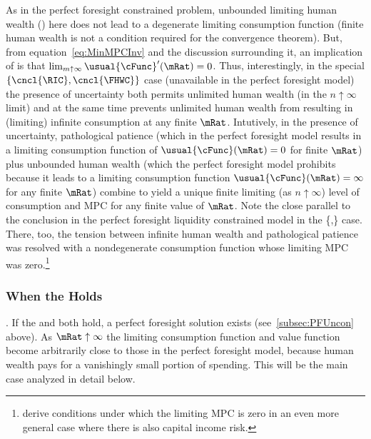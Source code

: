 \documentclass[BufferStockTheory]{subfiles}
\begin{document}
As in the perfect foresight constrained problem, unbounded limiting human wealth (\cncl{\FHWC}) here does not lead to a degenerate limiting consumption function (finite human wealth is not a condition required for the convergence theorem).  But, from equation~\eqref{eq:MinMPCInv} and the discussion surrounding it, an implication of \cncl{\RIC} is that $\lim_{m \uparrow \infty} \usual{\cFunc}^{\prime}(\mRat) = 0$.  Thus, interestingly, in the special $\{\cncl{\RIC},\cncl{\FHWC}\}$ case (unavailable in the perfect foresight model) the presence of uncertainty both permits unlimited human wealth (in the $n\uparrow\infty$ limit) and at the same time prevents unlimited human wealth from resulting in (limiting) infinite consumption at any finite $\mRat$.  Intutively, in the presence of uncertainty, pathological patience (which in the perfect foresight model results in a limiting consumption function of $\usual{\cFunc}(\mRat)=0$ for finite $\mRat$) plus unbounded human wealth (which the perfect foresight model prohibits because it leads to a limiting consumption function $\usual{\cFunc}(\mRat)=\infty$ for any finite $\mRat$) combine to yield a unique finite limiting (as $n \uparrow \infty$) level of consumption and MPC for any finite value of $\mRat$.  Note the close parallel to the conclusion in the perfect foresight liquidity constrained model in the \{\GICRaw,\cncl{\RIC}\} case.  There, too, the tension between infinite human wealth and pathological patience was resolved with a nondegenerate consumption function whose limiting MPC was zero.\footnote{\cite{maTodaRich} derive conditions under which the limiting MPC is zero in an even more general case where there is also capital income risk.}

\hypertarget{When-the-RIC-Holds}{}
\subsubsection{When the {\RIC} Holds}\label{subsubsec:WhenTheGICNrmFails}\label{subsubsec:WhenTheRICHolds}

\indent \textbf{\FHWC}.  If the {\RIC} and {\FHWC} both hold, a perfect foresight solution exists (see~\ref{subsec:PFUncon} above).  As $\mRat \uparrow \infty$ the limiting consumption function and value function become arbitrarily close to those in the perfect foresight model, because human wealth pays for a vanishingly small portion of spending.  This will be the main case analyzed in detail below.
\end{document}
